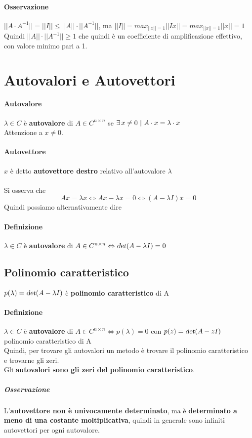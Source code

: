 \documentclass[10pt]{book}
\begin{document}
\paragraph{Osservazione} $||A\cdot A^{-1}|| = ||I|| \leq ||A||\cdot||A^{-1}||$, ma $||I|| = max_{||x|| = 1} ||Ix|| = max_{||x|| = 1} ||x|| = 1$\\
Quindi $||A||\cdot||A^{-1}|| \geq 1$ che quindi è un coefficiente di amplificazione effettivo, con valore minimo pari a 1.
\pagebreak
\section{Autovalori e Autovettori}
\paragraph{Autovalore}  $\lambda \in C$ è \textbf{autovalore} di $A \in C^{n \times n}$ se $\exists\, x \neq 0 \:\:\vline\:\:A\cdot x = \lambda\cdot x$\\
Attenzione a $x \neq 0$.
\paragraph{Autovettore} $x$ è detto \textbf{autovettore destro} relativo all'autovalore $\lambda$\\\\
Si osserva che 
$$Ax = \lambda x \Leftrightarrow Ax - \lambda x = 0 \Leftrightarrow (A - \lambda I)x = 0$$
Quindi possiamo alternativamente dire
\paragraph{Definizione} $\lambda \in C$ è \textbf{autovalore} di $A \in C^{n \times n} \Leftrightarrow \textsl{det}(A - \lambda I) = 0$
\subsection{Polinomio caratteristico}
$p(\lambda) = \textsl{det}(A - \lambda I)$ è \textbf{polinomio caratteristico} di A
\paragraph{Definizione} $\lambda \in C$ è \textbf{autovalore} di $A \in C^{n \times n} \Leftrightarrow p(\lambda) = 0$ con $p(z) = \textsl{det}(A - zI)$ polinomio caratteristico di A\\
Quindi, per trovare gli autovalori un metodo è trovare il polinomio caratteristico e trovarne gli zeri.\\Gli \textbf{autovalori sono gli zeri del polinomio caratteristico}.
\subparagraph{Osservazione} L'\textbf{autovettore non è univocamente determinato}, ma è \textbf{determinato a meno di una costante moltiplicativa}, quindi in generale sono infiniti autovettori per ogni autovalore.
\end{document}
